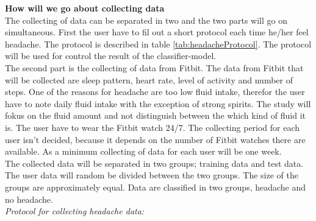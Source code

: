 \noindent\textbf{How will we go about collecting data} \\
The collecting of data can be separated in two and the two parts will go on simultaneous. First the user have to fil out a short protocol each time he/her feel headache. The protocol is described in table \ref{tab:headacheProtocol}. The protocol will be used for control the result of the classifier-model. \\
The second part is the collecting of data from Fitbit. The data from Fitbit that will be collected are sleep pattern, heart rate, level of activity and number of steps. One of the reasons for headache are too low fluid intake, therefor the user have to note daily fluid intake with the exception of strong spirits. The study will fokus on the fluid amount and not distinguish between the which kind of fluid it is. The user have to wear the Fitbit watch 24/7. The collecting period for each user isn't decided, because it depends on the number of Fitbit watches there are available. As a minimum collecting of data for each user will be one week. \\

\noindent The collected data will be separated in two groups; training data and test data. The user data will random be divided between the two groups. The size of the groups are approximately equal. Data are classified in two groups, headache and no headache.\\

\noindent\textit{Protocol for collecting headache data:}
\begin{table}[H]
\caption{Protocol for headache}
\label{tab:headacheProtocol}
\end{table}
